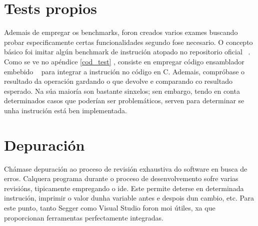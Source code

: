 \section{Tests propios}\label{sec:tests}
Ademais de empregar os benchmarks, foron creados varios exames buscando probar especificamente certas funcionalidades segundo fose necesario. O concepto básico foi imitar algún benchmark de instrución atopado no repositorio oficial ~\cite{riscv_tests}. Como se ve no apéndice \ref{cod_test} , consiste en empregar código ensamblador embebido ~\cite{asm_emb} para integrar a instrución no código en C. Ademais, compróbase o resultado da operación gardando o que devolve e comparando co resultado esperado. Na súa maioría son bastante sinxelos; sen embargo, tendo en conta determinados casos que poderían ser problemáticos, serven para determinar se unha instrución está ben implementada.


\section{Depuración}\label{sec:depuración}
Chámase depuración ao proceso de revisión exhaustiva do software en busca de erros. Calquera programa durante o proceso de desenvolvemento sofre varias revisións, tipicamente empregando o \acrshort{ide}. Este permite deterse en determinada instrución, imprimir o valor dunha variable antes e despois dun cambio, etc. Para este punto, tanto Segger como Visual Studio foron moi útiles, xa que proporcionan ferramentas perfectamente integradas.

